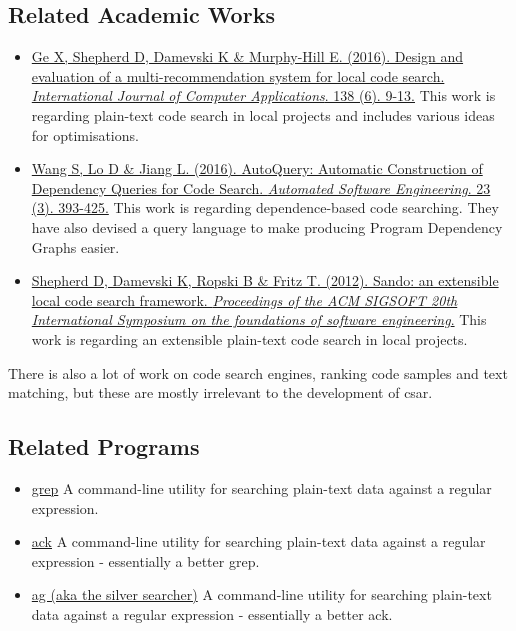 \documentclass[12pt, letterpaper, oneside]{article}
\begin{document}
\subsection{Related Academic Works}
\begin{itemize}
    \item \href{http://www.sciencedirect.com.ezproxy.library.qmul.ac.uk/science/article/pii/S1045926X16300970?_rdoc=1&_fmt=high&_origin=gateway&_docanchor=&md5=b8429449ccfc9c30159a5f9aeaa92ffb&ccp=y}{Ge X, Shepherd D, Damevski K \& Murphy-Hill E. (2016). Design and evaluation of a multi-recommendation system for local code search. \textit{International Journal of Computer Applications}. 138 (6). 9-13.}\newline
    This work is regarding plain-text code search in local projects and includes various ideas for optimisations.
    \item \href{https://link-springer-com.ezproxy.library.qmul.ac.uk/article/10.1007%2Fs10515-014-0170-2}{Wang S, Lo D \& Jiang L. (2016). AutoQuery: Automatic Construction of Dependency Queries for Code Search. \textit{Automated Software Engineering}. 23 (3). 393-425.}\newline
    This work is regarding dependence-based code searching.
    They have also devised a query language to make producing Program Dependency Graphs easier.
    \item \href{http://dl.acm.org.ezproxy.library.qmul.ac.uk/citation.cfm?id=2393612}{Shepherd D, Damevski K, Ropski B \& Fritz T. (2012). Sando: an extensible local code search framework. \textit{Proceedings of the ACM SIGSOFT 20th International Symposium on the foundations of software engineering}.}\newline
    This work is regarding an extensible plain-text code search in local projects.
\end{itemize}

There is also a lot of work on code search engines, ranking code samples and text matching, but these are mostly irrelevant to the development of csar.

\subsection{Related Programs}
\begin{itemize}
    \item \href{https://en.wikipedia.org/wiki/Grep}{grep}\newline
    A command-line utility for searching plain-text data against a regular expression.
    \item \href{https://beyondgrep.com/}{ack}\newline
    A command-line utility for searching plain-text data against a regular expression - essentially a better grep.
    \item \href{https://github.com/ggreer/the_silver_searcher}{ag (aka the silver searcher)}\newline
    A command-line utility for searching plain-text data against a regular expression - essentially a better ack.
\end{itemize}
\end{document}
